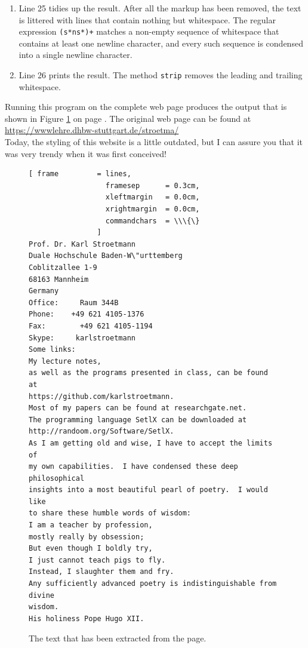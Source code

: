 \begin{enumerate}
      Note that the order of the lines 23 and 24 does not matter: since the character ``\texttt{\#}'' is not
      a letter, the regular expression of line 23 does not match any numerical entity, while the regular
      expression of line 24 only matches numerical entities.
\item Line 25 tidies up the result.  After all the markup has been removed, the text is littered with lines that
      contain nothing but whitespace.  The regular expression \texttt{(s*ns*)+}
      matches a non-empty sequence of whitespace that contains at least one newline character, and every such
      sequence is condensed into a single newline character.
\item Line 26 prints the result.  The method \texttt{strip} removes the leading and trailing whitespace.
\end{enumerate}

\noindent
Running this program on the complete web page produces the output that is shown in Figure
\ref{fig:homepage.txt} on page \pageref{fig:homepage.txt}.  The original web page can be found at
\\[0.2cm]
\hspace*{1.3cm}
\href{https://wwwlehre.dhbw-stuttgart.de/~stroetma/}{https://wwwlehre.dhbw-stuttgart.de/stroetma/}
\\[0.2cm]
Today, the styling of this website is a little outdated, but I can assure you that it was very trendy when it
was first conceived!

\begin{figure}[!ht]
\centering
\begin{Verbatim}[ frame         = lines, 
                  framesep      = 0.3cm, 
                  xleftmargin   = 0.0cm,
                  xrightmargin  = 0.0cm,
                  commandchars  = \\\{\}
                ]
Prof. Dr. Karl Stroetmann
Duale Hochschule Baden-W\"urttemberg
Coblitzallee 1-9
68163 Mannheim
Germany
Office:     Raum 344B
Phone:    +49 621 4105-1376
Fax:        +49 621 4105-1194
Skype:     karlstroetmann
Some links:
My lecture notes,
as well as the programs presented in class, can be found
at
https://github.com/karlstroetmann.
Most of my papers can be found at researchgate.net.
The programming language SetlX can be downloaded at
http://randoom.org/Software/SetlX.
As I am getting old and wise, I have to accept the limits of
my own capabilities.  I have condensed these deep philosophical
insights into a most beautiful pearl of poetry.  I would like
to share these humble words of wisdom:
I am a teacher by profession,
mostly really by obsession;
But even though I boldly try,
I just cannot teach pigs to fly.
Instead, I slaughter them and fry.
Any sufficiently advanced poetry is indistinguishable from divine
wisdom.
His holiness Pope Hugo XII.
\end{Verbatim}
\vspace*{-0.3cm}
\caption{The text that has been extracted from the  page.}
\label{fig:homepage.txt}
\end{figure}

